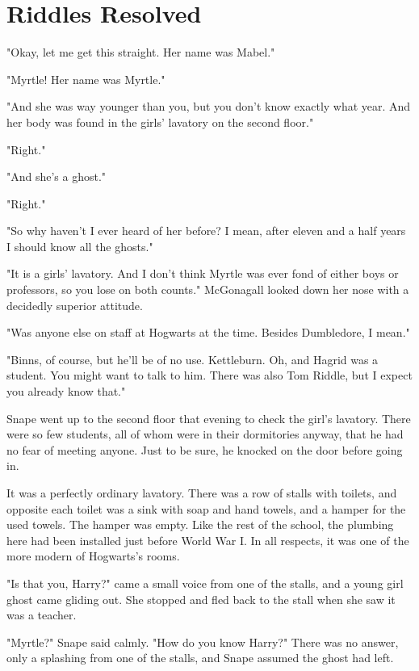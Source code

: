 
\chapter{Riddles Resolved}

"Okay, let me get this straight. Her name was Mabel."

"Myrtle! Her name was Myrtle."

"And she was way younger than you, but you don't know exactly what year. And her body was found in the girls' lavatory on the second floor."

"Right."

"And she's a ghost."

"Right."

"So why haven't I ever heard of her before? I mean, after eleven and a half years I should know all the ghosts."

"It is a girls' lavatory. And I don't think Myrtle was ever fond of either boys or professors, so you lose on both counts." McGonagall looked down her nose with a decidedly superior attitude.

"Was anyone else on staff at Hogwarts at the time. Besides Dumbledore, I mean."

"Binns, of course, but he'll be of no use. Kettleburn. Oh, and Hagrid was a student. You might want to talk to him. There was also Tom Riddle, but I expect you already know that."

Snape went up to the second floor that evening to check the girl's lavatory. There were so few students, all of whom were in their dormitories anyway, that he had no fear of meeting anyone. Just to be sure, he knocked on the door before going in.

It was a perfectly ordinary lavatory. There was a row of stalls with toilets, and opposite each toilet was a sink with soap and hand towels, and a hamper for the used towels. The hamper was empty. Like the rest of the school, the plumbing here had been installed just before World War I. In all respects, it was one of the more modern of Hogwarts's rooms.

"Is that you, Harry?" came a small voice from one of the stalls, and a young girl ghost came gliding out. She stopped and fled back to the stall when she saw it was a teacher.

"Myrtle?" Snape said calmly. "How do you know Harry?" There was no answer, only a splashing from one of the stalls, and Snape assumed the ghost had left.

